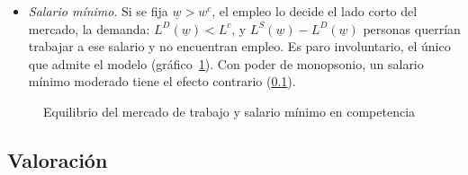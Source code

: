\documentclass[11pt]{article}
\begin{document}
\begin{itemize}
\item \emph{Salario mínimo}. Si se fija $\underline{w}>w^c$, el empleo lo decide el lado corto del mercado, la demanda: $L^D(\underline{w})<L^c$, y $L^S(\underline{w})-L^D(\underline{w})$ personas querrían trabajar a ese salario y no encuentran empleo. Es paro involuntario, el único que admite el modelo (gráfico~\ref{fig:equilibrio-trabajo}). Con poder de monopsonio, un salario mínimo moderado tiene el efecto contrario (\ref{sec:valoracion-neoclasica}).
\end{itemize}

\begin{figure}[H]
\centering
\caption{Equilibrio del mercado de trabajo y salario mínimo en competencia}\label{fig:equilibrio-trabajo}
\end{figure}

\subsection{Valoración}\label{sec:valoracion-neoclasica}
\end{document}
